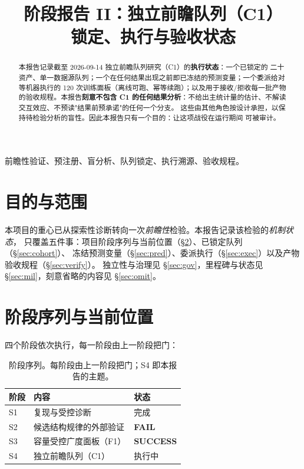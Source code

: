 \documentclass[conference]{IEEEtran}
\begin{document}
\title{阶段报告 II：独立前瞻队列（C1）\\锁定、执行与验收状态}

\author{
}

\maketitle

\begin{abstract}
本报告记录截至 2026-09-14 独立前瞻队列研究（C1）的\textbf{执行状态}：一个已锁定的
二十资产、单一数据源队列；一个在任何结果出现之前即已冻结的预测变量；一个委派给对等机器执行的
120 次训练面板（离线可跑、幂等续跑）；以及用于接收/拒收每一批产物的验收规程。本报告\textbf{刻意不包含
C1 的任何结果分析}：不给出主统计量的估计、不解读交互效应、不预读"结果前预承诺"的任何一个分支。
这些由其他角色按设计承担，以保持待检验分析的盲性。因此本报告只有一个目的：让这项战役在运行期间
可被审计。
\end{abstract}

\begin{IEEEkeywords}
前瞻性验证、预注册、盲分析、队列锁定、执行溯源、验收规程。
\end{IEEEkeywords}

\section{目的与范围}

本项目的重心已从探索性诊断转向一次\emph{前瞻性}检验。本报告记录该检验的\emph{机制状态}，
只覆盖五件事：项目阶段序列与当前位置（\S\ref{sec:seq}）、已锁定队列（\S\ref{sec:cohort}）、
冻结预测变量（\S\ref{sec:pred}）、委派执行（\S\ref{sec:exec}）以及产物验收规程（\S\ref{sec:verify}）。
独立性与治理见 \S\ref{sec:gov}，里程碑与状态见 \S\ref{sec:mil}，刻意省略的内容见 \S\ref{sec:omit}。

\section{阶段序列与当前位置}
\label{sec:seq}

四个阶段依次执行，每一阶段由上一阶段把门：

\begin{table}[!t]
\centering
\footnotesize
\setlength{\tabcolsep}{3pt}
\begin{tabular}{@{}p{}p{}p{}@{}}
\toprule
阶段 & 内容 & 状态 \\
\midrule
S1 & 复现与受控诊断 & 完成 \\
S2 & 候选结构规律的外部验证 & \textbf{FAIL} \\
S3 & 容量受控广度面板（F1） & \textbf{SUCCESS} \\
S4 & 独立前瞻队列（C1） & 执行中 \\
\bottomrule
\end{tabular}
\caption{阶段序列。每阶段由上一阶段把门；S4 即本报告的主题。}
\label{tab:seq}
\end{table}
\end{document}
